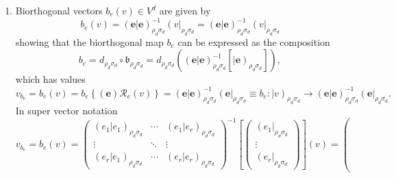 \documentclass[aps,preprint]{revtex4}
\begin{document}
\begin{enumerate}
\item Biorthogonal vectors $b_{e}\left( v\right) \in V^{d}$ are given by%
\begin{equation}
b_{e}\left( v\right) =\left( \left. \boldsymbol{e}\right\vert \boldsymbol{e}%
\right) _{\rho _{d}\sigma _{d}}^{-1}\left( v\right\vert _{\rho _{d}\sigma
_{d}}=\left( \left. \boldsymbol{e}\right\vert \boldsymbol{e}\right) _{\rho
_{d}\sigma _{d}}^{-1}\left( v\right\vert _{\rho _{d}\sigma _{d}}
\end{equation}%
showing that the biorthogonal map $b_{e}$ can be expressed as the
composition 
\begin{equation}
b_{e}=d_{\rho _{d}\sigma _{d}}\circ \mathfrak{b}_{\rho _{d}\sigma
_{d}}=d_{\rho _{d}\sigma _{d}}\left( \left( \left. \boldsymbol{e}\right\vert 
\boldsymbol{e}\right) _{\rho _{d}\sigma _{d}}^{-1}\left[ \left\vert 
\boldsymbol{e}\right) _{\rho _{d}\sigma _{d}}\right] \right) ,
\end{equation}%
which has values 
\begin{equation}
v_{b_{e}}=b_{e}\left( v\right) =b_{e}\left\{ \left( \boldsymbol{e}\right) 
\mathcal{R}_{e}\left( v\right) \right\} =\left( \left. \boldsymbol{e}%
\right\vert \boldsymbol{e}\right) _{\rho _{d}\sigma _{d}}^{-1}\left( 
\boldsymbol{e}\right\vert _{\rho _{d}\sigma _{d}}\equiv b_{e}:\left\vert
v\right) _{\rho _{d}\sigma _{d}}\rightarrow \left( \left. \boldsymbol{e}%
\right\vert \boldsymbol{e}\right) _{\rho _{d}\sigma _{d}}^{-1}\left( 
\boldsymbol{e}\right\vert _{\rho _{d}\sigma _{d}}.
\end{equation}%
In super vector notation 
\begin{equation}
v_{b_{e}}=b_{e}\left( v\right) =\left( 
\begin{array}{ccc}
\left( \left. e_{1}\right\vert e_{1}\right) _{\rho _{d}\sigma _{d}} & \cdots
& \left( \left. e_{1}\right\vert e_{r}\right) _{\rho _{d}\sigma _{d}} \\ 
\vdots & \ddots & \vdots \\ 
\left( \left. e_{r}\right\vert e_{1}\right) _{\rho _{d}\sigma _{d}} & \cdots
& \left( \left. e_{r}\right\vert e_{r}\right) _{\rho _{d}\sigma _{d}}%
\end{array}%
\right) ^{\boldsymbol{-}1}\left[ \left( 
\begin{array}{c}
\left( e_{1}\right\vert _{\rho _{d}\sigma _{d}} \\ 
\vdots \\ 
\left( e_{r}\right\vert _{\rho _{d}\sigma _{d}}%
\end{array}%
\right) \right] \left( v\right) =\left( 

\end{equation}
\end{enumerate}
\end{document}
